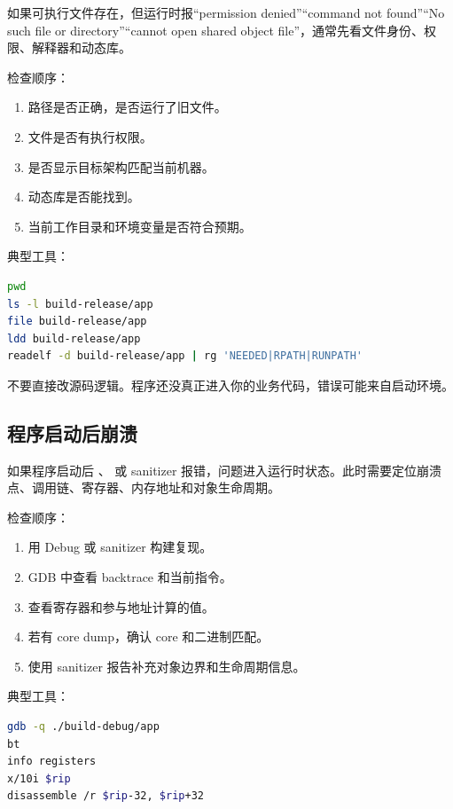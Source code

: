 如果可执行文件存在，但运行时报“permission denied”“command not found”“No such file or directory”“cannot open shared object file”，通常先看文件身份、权限、解释器和动态库。

检查顺序：

\begin{enumerate}
  \item 路径是否正确，是否运行了旧文件。
  \item 文件是否有执行权限。
  \item {} 是否显示目标架构匹配当前机器。
  \item 动态库是否能找到。
  \item 当前工作目录和环境变量是否符合预期。
\end{enumerate}

典型工具：

\begin{lstlisting}[language=bash]
pwd
ls -l build-release/app
file build-release/app
ldd build-release/app
readelf -d build-release/app | rg 'NEEDED|RPATH|RUNPATH'
\end{lstlisting}

不要直接改源码逻辑。程序还没真正进入你的业务代码，错误可能来自启动环境。

\subsection{程序启动后崩溃}

如果程序启动后 、 或 sanitizer 报错，问题进入运行时状态。此时需要定位崩溃点、调用链、寄存器、内存地址和对象生命周期。

检查顺序：

\begin{enumerate}
  \item 用 Debug 或 sanitizer 构建复现。
  \item GDB 中查看 backtrace 和当前指令。
  \item 查看寄存器和参与地址计算的值。
  \item 若有 core dump，确认 core 和二进制匹配。
  \item 使用 sanitizer 报告补充对象边界和生命周期信息。
\end{enumerate}

典型工具：

\begin{lstlisting}[language=bash]
gdb -q ./build-debug/app
bt
info registers
x/10i $rip
disassemble /r $rip-32, $rip+32
\end{lstlisting}

